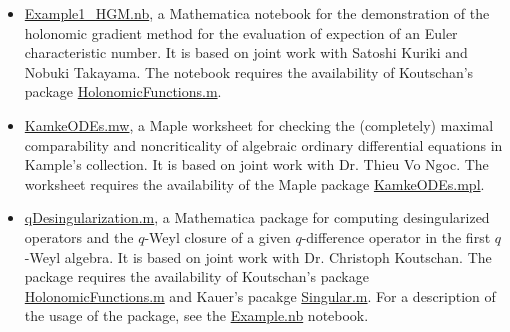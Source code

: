 \documentclass[a4paper,12pt]{article}
\begin{document}
\begin{itemize}
  of a Ferrers board (shape), checking the number of
    sigma-avoiding $0$-$1$-fillings of a Ferrers board, 
     generating generalized $0$-$1$-fillings of a Ferrers board, 
     and checking the number of generalized $0$-$1$-fillings of a Ferrers board with weight $n$
    such that the longest ne-chain has length $u$ 
    and the longest se-chain has length $v$. It is based on joint work with Ting
    Guo and Christian Krattenthaler. For a demonstration of the package,
    see the \href{https://yzhang1616.github.io/zof/zof.nb}{zof.nb} notebook. 
  \item \href{https://yzhang1616.github.io/ec1/Example1_HGM.nb}{Example1\_HGM.nb}, a Mathematica notebook for
    the demonstration of the holonomic gradient method for the evaluation of
    expection of an Euler characteristic number. It is based on joint work
    with Satoshi Kuriki and Nobuki Takayama. 
    The notebook requires the availability of Koutschan's package 
     \href{http://www.risc.jku.at/research/combinat/software/ergosum/RISC/HolonomicFunctions.html}{HolonomicFunctions.m}.
  \item \href{https://yzhang1616.github.io/KamkeODEs.mw}{KamkeODEs.mw}, a Maple worksheet for 
     checking the (completely) maximal comparability and noncriticality of algebraic
     ordinary differential equations in
     Kample's collection. It is based on joint work with Dr. Thieu Vo Ngoc. 
     The worksheet requires the availability of the Maple package \href{https://yzhang1616.github.io/KamkeODEs.mpl}{KamkeODEs.mpl}.
 \item \href{https://yzhang1616.github.io/qDesingularization.m}{qDesingularization.m}, a Mathematica
     package for computing desingularized operators and the $q$-Weyl closure of
     a given $q$-difference operator in
     the first $q$-Weyl algebra. It is based on joint work with Dr. Christoph
     Koutschan. The package requires the availability of Koutschan's package
     \href{http://www.risc.jku.at/research/combinat/software/ergosum/RISC/HolonomicFunctions.html}{HolonomicFunctions.m}
     and Kauer's pacakge \href{https://www.risc.jku.at/research/combinat/risc/software/Singular/index.html}{Singular.m}.
     For a description of the usage of the package, see the \href{https://yzhang1616.github.io/Example.nb}{Example.nb} notebook.
\end{itemize}
\end{document}
